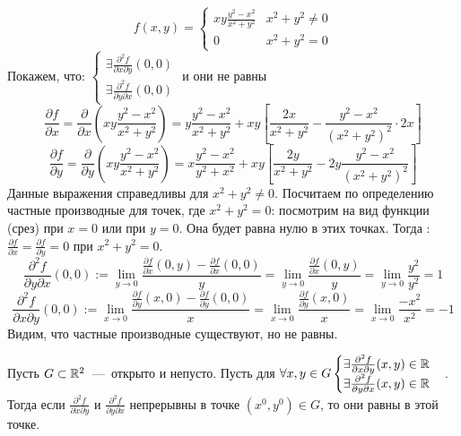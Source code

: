 \begin{example}
    \begin{equation*}
        f(x, y) = 
        \begin{cases}
            xy\frac{y^2 - x^2}{x^2 + y^2} & x^2+y^2 \neq 0 \\
            0 & x^2 + y^2 = 0
        \end{cases}
    \end{equation*}
    Покажем, что: 
    $
        \begin{cases}
             \exists \frac{\partial^2f}{\partial x \partial y}(0, 0) \\ 
             \exists \frac{\partial^2f}{\partial y \partial x}(0, 0)
        \end{cases}
    $ и они не равны
    $$\frac{\partial f}{\partial x} =\frac{\partial}{\partial x}\left(xy \frac{y^2 - x^2}{x^2 + y^2}\right) = y \frac{y^2 - x^2}{x^2 + y^2} + xy
    \left[\frac{2x}{x^2 + y^2} - \frac{y^2 - x^2}{(x^2 + y^2)^2}\cdot 2x\right]$$
    $$\dfrac{\partial f}{\partial y} = \frac{\partial}{\partial y}\left(xy \frac{y^2 - x^2}{x^2 + y^2}\right) = x \frac{y^2 - x^2}{y^2 + x^2} + xy\left[ \frac{2y}{x^2 + y^2} - 2y \frac{y^2 - x^2}{(x^2 + y^2)^2}\right]$$
    Данные выражения справедливы для $x^2 + y^2 \neq 0$. Посчитаем по определению частные производные для точек, где $x^2 + y^2 = 0$: посмотрим на вид функции (срез) при $x = 0$ или при $y = 0$. Она будет равна нулю в этих точках. Тогда : $\frac{\partial f}{\partial x} = \frac{\partial f}{\partial y} = 0$ при $x^2 + y^2 = 0$.
    $$\frac{\partial^2 f}{\partial y \partial x}(0, 0):= \lim \limits_{y \rightarrow 0} \dfrac{\frac{\partial f}{\partial x} (0, y)- \frac{\partial f}{\partial x}(0, 0)}{y} = \lim \limits_{y \rightarrow 0} \dfrac{\frac{\partial f}{\partial x}(0, y)}{y} = \lim \limits_{y \rightarrow 0} \dfrac{y^2}{y^2} = 1$$
    $$\frac{\partial^2 f}{\partial x \partial y}(0, 0) := \lim \limits_{x \rightarrow 0}\dfrac{\frac{\partial f}{\partial y}(x, 0) - \frac{\partial f}{\partial y}(0, 0)}{x} = \lim \limits_{x \rightarrow 0}\dfrac{\frac{\partial f}{\partial y}(x, 0)}{x} = \lim \limits_{x \rightarrow 0}\dfrac{-x^2}{x^2} = -1$$
    Видим, что частные производные существуют, но не равны.
\end{example}
\begin{theorem} \hypertarget{thrm2.2}{}
    Пусть $G \subset \mathbb{R}^2$~---~открыто и непусто. Пусть для $\forall x, y \in G \begin{cases}
        \exists \frac{\partial^2 f}{\partial x \partial y}(x, y) \in \mathbb{R} \\ 
        \exists \frac{\partial^2 f}{\partial y \partial x}(x, y) \in \mathbb{R}
    \end{cases}$. Тогда если $\frac{\partial^2 f}{\partial x \partial y}$ и $\frac{\partial^2 f}{\partial y \partial x}$ непрерывны в точке $(x^0, y^0) \in G$, то они равны в этой точке. 
\end{theorem}
